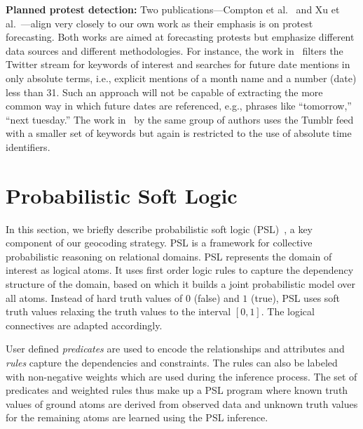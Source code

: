 \documentclass[letterpaper]{article}
\begin{document}
{\bf Planned protest detection:}
Two publications---Compton et al.~ and
Xu et al.~---align very closely to our own work
as their emphasis is on protest forecasting.  Both works are aimed at
forecasting protests but emphasize different data sources and different
methodologies. For instance, the work in~\cite{compton2013detecting}
filters the Twitter stream for keywords of interest and searches for
future date mentions in only absolute terms, i.e., explicit mentions of
a month name and a number (date) less than 31.  Such an approach will
not be capable of extracting the more common way in which future dates
are referenced, e.g., phrases like ``tomorrow,'' ``next tuesday.'' The
work in~\cite{xu2014civil} by the same group of authors uses the Tumblr
feed with a smaller set of keywords but again is restricted to the use
of absolute time identifiers.

\section{Probabilistic Soft Logic}
In this section, we briefly describe probabilistic soft logic
(PSL)~\cite{kimmig2012short}, a key component of our geocoding strategy.
PSL is a framework for collective probabilistic reasoning on relational
domains.  PSL represents the domain of interest as logical atoms.  It
uses first order logic rules to capture the dependency structure of the
domain, based on which it builds a joint probabilistic model over all
atoms.  Instead of hard truth values of $0$ (false) and $1$ (true), PSL
uses soft truth values relaxing the truth values to the interval
$[0,1]$.  The logical connectives are adapted accordingly.

User defined \emph{predicates} are used to encode the relationships and
attributes and \emph{rules} capture the  dependencies and constraints.
The rules can also be labeled with non-negative weights which are used
during the inference process.  The set of predicates and weighted rules
thus make up a PSL program where known truth values of ground atoms
 are derived from observed data and unknown truth values for the remaining
atoms are learned using the PSL inference.
\end{document}
